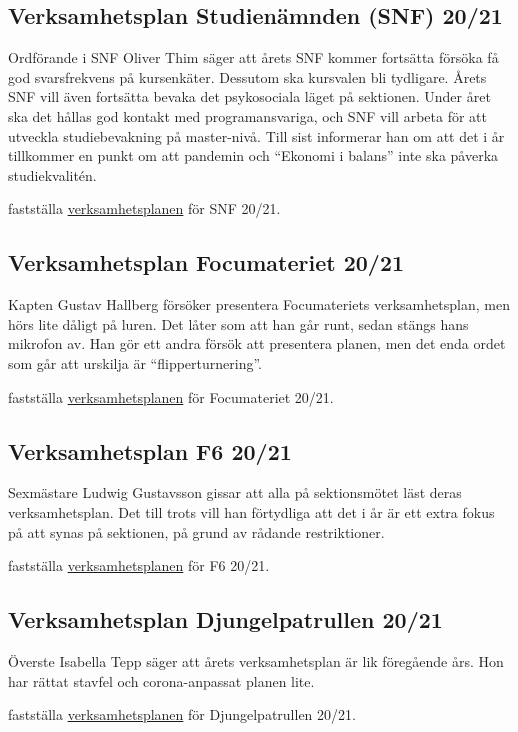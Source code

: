 \documentclass[hidelinks]{../sektionsmote} %
\begin{document}
\subsection{Verksamhetsplan Studienämnden (SNF) 20/21}
Ordförande i SNF Oliver Thim säger att årets SNF kommer fortsätta försöka få god svarsfrekvens på kursenkäter.
Dessutom ska kursvalen bli tydligare.
Årets SNF vill även fortsätta bevaka det psykosociala läget på sektionen.
Under året ska det hållas god kontakt med programansvariga, och SNF vill arbeta för att utveckla studiebevakning på master-nivå.
Till sist informerar han om att det i år tillkommer en punkt om att pandemin och \enquote{Ekonomi i balans} inte ska påverka studiekvalitén.
\begin{beslut}
    \item fastställa \hyperlink{bilagor/snf/vp.pdf.1}{verksamhetsplanen} för SNF 20/21.
\end{beslut}
    
\subsection{Verksamhetsplan Focumateriet 20/21}
Kapten Gustav Hallberg försöker presentera Focumateriets verksamhetsplan, men hörs lite dåligt på luren.
Det låter som att han går runt, sedan stängs hans mikrofon av.
Han gör ett andra försök att presentera planen, men det enda ordet som går att urskilja är \enquote{flipperturnering}.
\begin{beslut}
    \item fastställa \hyperlink{bilagor/foc/vp.pdf.1}{verksamhetsplanen} för Focumateriet 20/21.
\end{beslut}

\subsection{Verksamhetsplan F6 20/21}
Sexmästare Ludwig Gustavsson gissar att alla på sektionsmötet läst deras verksamhetsplan.
Det till trots vill han förtydliga att det i år är ett extra fokus på att synas på sektionen, på grund av rådande restriktioner.
\begin{beslut}
    \item fastställa \hyperlink{bilagor/f6/vp.pdf.1}{verksamhetsplanen} för F6 20/21.
\end{beslut}

\subsection{Verksamhetsplan Djungelpatrullen 20/21}
Överste Isabella Tepp säger att årets verksamhetsplan är lik föregående års.
Hon har rättat stavfel och corona-anpassat planen lite.
\begin{beslut}
    \item fastställa \hyperlink{bilagor/pd/vp.pdf.1}{verksamhetsplanen} för Djungelpatrullen 20/21.
\end{beslut}
\end{document}
